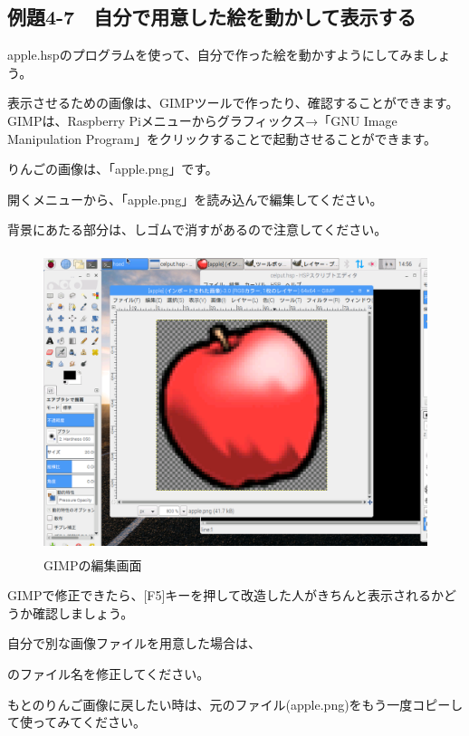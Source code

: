 \newpage
\subsection{例題4-7　自分で用意した絵を動かして表示する}


\begin{description}
    \item {}
\end{description}



apple.hspのプログラムを使って、自分で作った絵を動かすようにしてみましょう。

表示させるための画像は、GIMPツールで作ったり、確認することができます。GIMPは、Raspberry
Piメニューからグラフィックス→「GNU Image Manipulation Program」をクリックすることで起動させることができます。

りんごの画像は、「apple.png」です。

開くメニューから、「apple.png」を読み込んで編集してください。

背景にあたる部分は、しゴムで消すがあるので注意してください。


\begin{figure}[H]
    \begin{center}
      \includegraphics[keepaspectratio,width=11.712cm,height=8.784cm]{text04-img/s_gimpedit.png}
      \caption{GIMPの編集画面}
    \end{center}
    \label{fig:prog_menu}
\end{figure}

\begin{description}
    \item {}
\end{description}



GIMPで修正できたら、[F5]キーを押して改造した人がきちんと表示されるかどうか確認しましょう。

自分で別な画像ファイルを用意した場合は、

\begin{description}
    \item {}
\end{description}


のファイル名を修正してください。

もとのりんご画像に戻したい時は、元のファイル(apple.png)をもう一度コピーして使ってみてください。





